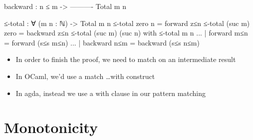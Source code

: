 \documentclass{lecturenotes}
\begin{document}
\begin{itemize}
\begin{code}
  backward :
      n ≤ m ->
    ----------
    Total m n

≤-total : ∀ (m n : ℕ) -> Total m n
≤-total zero n = forward z≤n
≤-total (suc m) zero = backward z≤n
≤-total (suc m) (suc n) with ≤-total m n
...                        | forward  m≤n = forward  (s≤s m≤n)
...                        | backward n≤m = backward (s≤s n≤m)
\end{code}
\begin{itemize}
\item In order to finish the proof, we need to match on an intermediate result
\item In OCaml, we'd use a \textsf{match \dots with} construct
\item In agda, instead we use a \textsf{with} clause in our pattern matching
\end{itemize}

\end{itemize}

\section{Monotonicity}
\label{sec:monotonicity}
\end{document}
